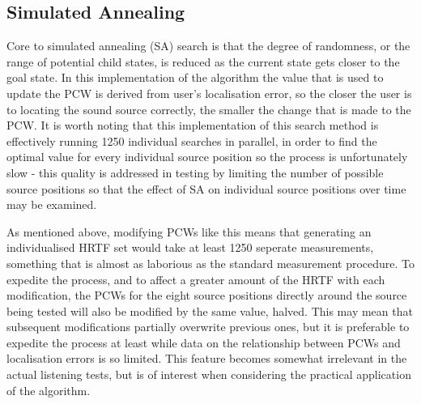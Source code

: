 \subsection{Simulated Annealing}
Core to simulated annealing (SA) search is that the degree of randomness, or the range of potential child states, is reduced as the current state gets closer to the goal state. In this implementation of the algorithm the value that is used to update the PCW is derived from user's localisation error, so the closer the user is to locating the sound source correctly, the smaller the change that is made to the PCW. It is worth noting that this implementation of this search method is effectively running 1250 individual searches in parallel, in order to find the optimal value for every individual source position so the process is unfortunately slow - this quality is addressed in testing by limiting the number of possible source positions so that the effect of SA on individual source positions over time may be examined.

As mentioned above, modifying PCWs like this means that generating an individualised HRTF set would take at least 1250 seperate measurements, something that is almost as laborious as the standard measurement procedure. To expedite the process, and to affect a greater amount of the HRTF with each modification, the PCWs for the eight source positions directly around the source being tested will also be modified by the same value, halved. This may mean that subsequent modifications partially overwrite previous ones, but it is preferable to expedite the process at least while data on the relationship between PCWs and localisation errors is so limited. This feature becomes somewhat irrelevant in the actual listening tests, but is of interest when considering the practical application of the algorithm.

